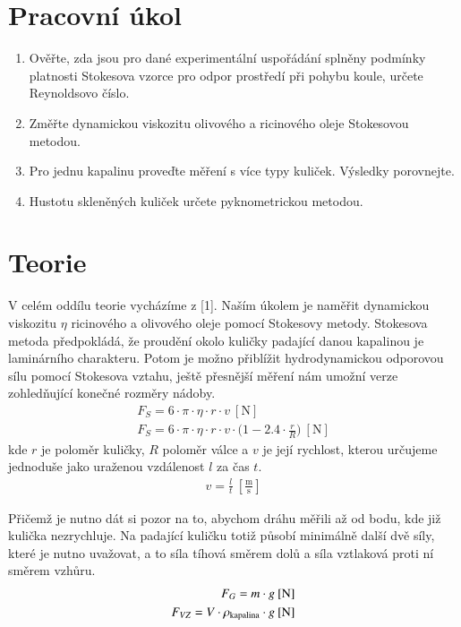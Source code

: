 \documentclass[a4paper]{article}
\author{"Patrik Novotný"}
\begin{document}
\section*{Pracovní úkol}
\begin{enumerate}
\item Ověřte, zda jsou pro dané experimentální uspořádání splněny podmínky platnosti Stokesova vzorce pro odpor prostředí při pohybu koule, určete Reynoldsovo číslo.
\item Změřte dynamickou viskozitu olivového a ricinového oleje Stokesovou metodou.
\item Pro jednu kapalinu proveďte měření s více typy kuliček. Výsledky porovnejte.
\item Hustotu skleněných kuliček určete pyknometrickou metodou.
\end{enumerate}
\section*{Teorie}
V celém oddílu teorie vycházíme z [1]. Naším úkolem je naměřit dynamickou viskozitu $\eta$ ricinového a olivového oleje pomocí Stokesovy metody. Stokesova metoda předpokládá, že proudění okolo kuličky padající danou kapalinou je laminárního charakteru. Potom je možno přiblížit hydrodynamickou odporovou sílu pomocí Stokesova vztahu, ještě přesnější měření nám umožní verze zohledňující konečné rozměry nádoby.
\begin{align}
F_{S} = 6 \cdot \pi \cdot \eta \cdot r \cdot v   \: \mathrm{[N]} \\
F_{S} = 6 \cdot \pi \cdot \eta \cdot r \cdot v \cdot \bigg(1 - 2.4 \cdot \frac{r}{R} \bigg)   \: \mathrm{[N]}
\end{align}
kde $r$ je poloměr kuličky, $R$ poloměr válce a $v$ je její rychlost, kterou určujeme jednoduše jako uraženou vzdálenost $l$ za čas $t$.
\begin{align}
v = \frac{l}{t}  \: \mathrm{[\frac{m}{s}]}
\end{align}
\par Přičemž je nutno dát si pozor na to, abychom dráhu měřili až od bodu, kde již kulička nezrychluje. Na padající kuličku totiž působí minimálně další dvě síly, které je nutno uvažovat, a to síla tíhová směrem dolů a síla vztlaková proti ní směrem vzhůru.
\begin{align}
F_{G} = m \cdot g  \: \mathrm{[N]} \\
F_{VZ} = V \cdot \rho_{\textnormal{kapalina}} \cdot g \: \mathrm{[N]}
\end{align}
\end{document}
